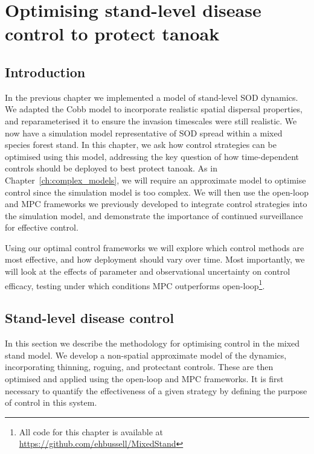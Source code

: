 %
\chapter{Optimising stand-level disease control to protect tanoak\label{ch:protect_tanoak_control}}

\section{Introduction\label{sec:ch6:intro}}

In the previous chapter we implemented a model of stand-level SOD dynamics. We adapted the Cobb model \citep{cobb_ecosystem_2012} to incorporate realistic spatial dispersal properties, and reparameterised it to ensure the invasion timescales were still realistic. We now have a simulation model representative of SOD spread within a mixed species forest stand. In this chapter, we ask how control strategies can be optimised using this model, addressing the key question of how time-dependent controls should be deployed to best protect tanoak. As in Chapter~\ref{ch:complex_models}, we will require an approximate model to optimise control since the simulation model is too complex. We will then use the open-loop and MPC frameworks we previously developed to integrate control strategies into the simulation model, and demonstrate the importance of continued surveillance for effective control.

Using our optimal control frameworks we will explore which control methods are most effective, and how deployment should vary over time. Most importantly, we will look at the effects of parameter and observational uncertainty on control efficacy, testing under which conditions MPC outperforms open-loop\footnote{All code for this chapter is available at \url{https://github.com/ehbussell/MixedStand}}.

\section{Stand-level disease control\label{sec:ch6:control}}

In this section we describe the methodology for optimising control in the mixed stand model. We develop a non-spatial approximate model of the dynamics, incorporating thinning, roguing, and protectant controls. These are then optimised and applied using the open-loop and MPC frameworks. It is first necessary to quantify the effectiveness of a given strategy by defining the purpose of control in this system.

